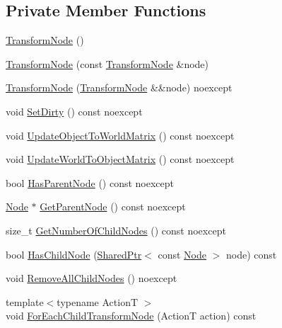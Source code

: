 \subsection*{Private Member Functions}
\begin{DoxyCompactItemize}
\item 
\hyperlink{structmage_1_1_transform_node_aec41a87ef5f7bca905e1de4b8959350a}{Transform\+Node} ()
\item 
\hyperlink{structmage_1_1_transform_node_a33ae343355c328a543b8665f7f1e9c3f}{Transform\+Node} (const \hyperlink{structmage_1_1_transform_node}{Transform\+Node} \&node)
\item 
\hyperlink{structmage_1_1_transform_node_aff227d1925614bc5afc03c981bc2a717}{Transform\+Node} (\hyperlink{structmage_1_1_transform_node}{Transform\+Node} \&\&node) noexcept
\item 
void \hyperlink{structmage_1_1_transform_node_aef6e402c69bb125b09925b7a5ca79b33}{Set\+Dirty} () const noexcept
\item 
void \hyperlink{structmage_1_1_transform_node_a2102425a193884bea453c783388f6a38}{Update\+Object\+To\+World\+Matrix} () const noexcept
\item 
void \hyperlink{structmage_1_1_transform_node_aec6309962398c128fdf3f50cbff13e89}{Update\+World\+To\+Object\+Matrix} () const noexcept
\item 
bool \hyperlink{structmage_1_1_transform_node_ad225b5c9f2236f8c6c91dd7a6a9c4ffd}{Has\+Parent\+Node} () const noexcept
\item 
\hyperlink{classmage_1_1_node}{Node} $\ast$ \hyperlink{structmage_1_1_transform_node_a63ed2249e0629f0874da5095c0deb705}{Get\+Parent\+Node} () const noexcept
\item 
size\+\_\+t \hyperlink{structmage_1_1_transform_node_a3efc0401cee8fc6215148963ce3e8227}{Get\+Number\+Of\+Child\+Nodes} () const noexcept
\item 
bool \hyperlink{structmage_1_1_transform_node_ac83d9d2013494588fb45a469057b18f6}{Has\+Child\+Node} (\hyperlink{namespacemage_a1e01ae66713838a7a67d30e44c67703e}{Shared\+Ptr}$<$ const \hyperlink{classmage_1_1_node}{Node} $>$ node) const
\item 
void \hyperlink{structmage_1_1_transform_node_aae7e3f918bcf38bd16db8475c7797c0b}{Remove\+All\+Child\+Nodes} () noexcept
\item 
{\footnotesize template$<$typename ActionT $>$ }\\void \hyperlink{structmage_1_1_transform_node_ad9c166b58e3718125d2a51827f8d7ca2}{For\+Each\+Child\+Transform\+Node} (ActionT action) const

\end{DoxyCompactItemize}

